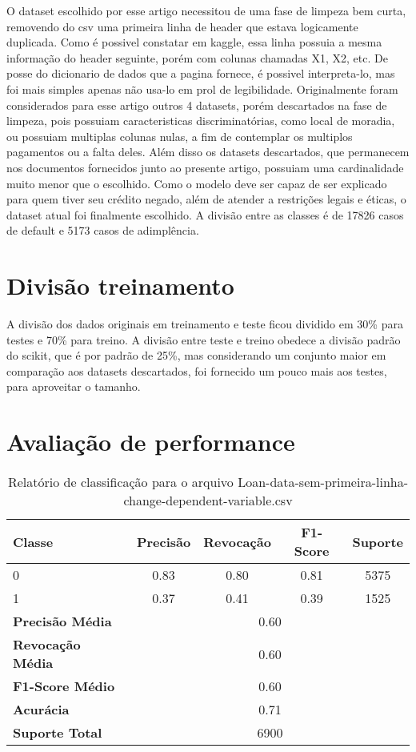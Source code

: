 \documentclass[12pt]{article}
\begin{document}
O dataset escolhido por esse artigo\cite{dataset} necessitou de uma fase de limpeza bem curta, removendo do csv uma primeira linha de header que estava logicamente duplicada. Como é possivel constatar em kaggle\cite{kaggle}, essa linha possuia a mesma informação do header seguinte, porém com colunas chamadas X1, X2, etc. De posse do dicionario de dados que a pagina fornece, é possivel interpreta-lo, mas foi mais simples apenas não usa-lo em prol de legibilidade. Originalmente foram considerados para esse artigo outros 4 datasets, porém descartados na fase de limpeza, pois possuiam caracteristicas discriminatórias, como local de moradia, ou possuiam multiplas colunas nulas, a fim de contemplar os multiplos pagamentos ou a falta deles. Além disso os datasets descartados, que permanecem nos documentos fornecidos junto ao presente artigo, possuiam uma cardinalidade muito menor que o escolhido. Como o modelo deve ser capaz de ser explicado para quem tiver seu crédito negado, além de atender a restrições legais e éticas, o dataset atual foi finalmente escolhido. A divisão entre as classes é de 17826 casos de default e 5173 casos de adimplência.

\section{Divisão treinamento}

A divisão dos dados originais em treinamento e teste ficou dividido em 30\% para testes e 70\% para treino. A divisão entre teste e treino obedece a divisão padrão do scikit, que é por padrão de 25\%, mas considerando um conjunto maior em comparação aos datasets descartados, foi fornecido um pouco mais aos testes, para aproveitar o tamanho.

\section{Avaliação de performance}
\begin{table}[h]
	\centering
	\begin{tabular}{lcccc}
		\hline
		\textbf{Classe} & \textbf{Precisão} & \textbf{Revocação} & \textbf{F1-Score} & \textbf{Suporte} \\ \hline
		0                & 0.83              & 0.80               & 0.81               & 5375              \\
		1                & 0.37              & 0.41               & 0.39               & 1525              \\ \hline
		\textbf{Precisão Média} & \multicolumn{4}{c}{0.60} \\
		\textbf{Revocação Média} & \multicolumn{4}{c}{0.60} \\
		\textbf{F1-Score Médio} & \multicolumn{4}{c}{0.60} \\
		\textbf{Acurácia} & \multicolumn{4}{c}{0.71} \\
		\textbf{Suporte Total} & \multicolumn{4}{c}{6900} \\ \hline
	\end{tabular}
	\caption{Relatório de classificação para o arquivo Loan-data-sem-primeira-linha-change-dependent-variable.csv}
	\label{tab:class_report}
\end{table}
\end{document}
